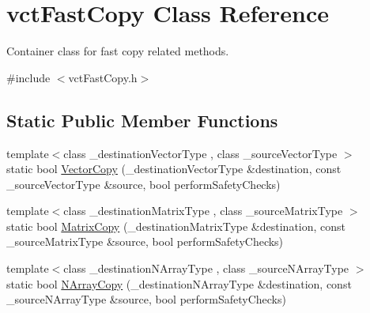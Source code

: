 \hypertarget{classvct_fast_copy}{\section{vct\-Fast\-Copy Class Reference}
\label{classvct_fast_copy}
}


Container class for fast copy related methods.  




{\ttfamily \#include $<$vct\-Fast\-Copy.\-h$>$}

\subsection*{Static Public Member Functions}
\begin{DoxyCompactItemize}
\item 
{\footnotesize template$<$class \-\_\-destination\-Vector\-Type , class \-\_\-source\-Vector\-Type $>$ }\\static bool \hyperlink{classvct_fast_copy_aacb33101a27b7973d2f481d4f7715d12}{Vector\-Copy} (\-\_\-destination\-Vector\-Type \&destination, const \-\_\-source\-Vector\-Type \&source, bool perform\-Safety\-Checks)
\item 
{\footnotesize template$<$class \-\_\-destination\-Matrix\-Type , class \-\_\-source\-Matrix\-Type $>$ }\\static bool \hyperlink{classvct_fast_copy_ad56179d475fbc94f78dd84a22c4be580}{Matrix\-Copy} (\-\_\-destination\-Matrix\-Type \&destination, const \-\_\-source\-Matrix\-Type \&source, bool perform\-Safety\-Checks)
\item 
{\footnotesize template$<$class \-\_\-destination\-N\-Array\-Type , class \-\_\-source\-N\-Array\-Type $>$ }\\static bool \hyperlink{classvct_fast_copy_a97dd2f0d94e538ba59937186bc3cf8d0}{N\-Array\-Copy} (\-\_\-destination\-N\-Array\-Type \&destination, const \-\_\-source\-N\-Array\-Type \&source, bool perform\-Safety\-Checks)
\end{DoxyCompactItemize}
{\bf }\par
